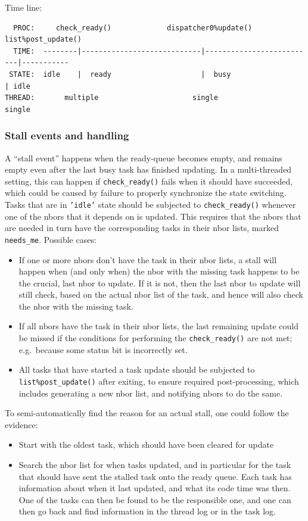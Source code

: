 \documentclass[paper=a4,fontsize=11pt]{scrartcl}
\numberwithin{equation}{section}		%
\numberwithin{figure}{section}			%
\numberwithin{table}{section}				%
\newcommand{\codecolor}{\color{Blue}}
\newcommand{\Code}[1]{{\codecolor\texttt{#1}}}
\def\checkready{\Code{check\_ready()}}
\def\eg{e.g.\ }
\begin{document}
Time line:
{\codecolor\small\begin{verbatim}
  PROC:     check_ready()             dispatcher0%update()        list%post_update()
  TIME:  --------|----------------------------|--------------------------|-----------
 STATE:  idle    |  ready                     |  busy                    | idle
THREAD:       multiple                      single                    single
\end{verbatim}}

\subsubsection{Stall events and handling}
A ``stall event'' happens when the ready-queue becomes empty, and remains empty even after the last busy task has finished updating.  In a multi-threaded setting, this can happen if \checkready{} fails when it should have succeeded, which could be caused by failure to properly synchronize the state switching.  Tasks that are in \Code{'idle'} state should be subjected to \checkready{} whenever one of the nbors that it depends on is updated.   This requires that the nbors that are needed in turn have the corresponding tasks in their nbor lists, marked \Code{needs\_me}.  Possible cases:
\begin{itemize}
    \item If one or more nbors don't have the task in their nbor lists, a stall will happen when (and only when) the nbor with the missing task happens to be the crucial, last nbor to update.  If it is not, then the last nbor to update will still check, based on the actual nbor list of the task, and hence will also check the nbor with the missing task.
    \item If all nbors have the task in their nbor lists, the last remaining update could be missed if the conditions for performing the \checkready{} are not met; \eg because some status bit is incorrectly set.
    \item All tasks that have started a task update should be subjected to \Code{list\%post\_update()} after exiting, to ensure required post-processing, which includes generating a new nbor list, and notifying nbors to do the same.
\end{itemize}
To semi-automatically find the reason for an actual stall, one could follow the evidence:
\begin{itemize}
    \item Start with the oldest task, which should have been cleared for update
    \item Search the nbor list for when tasks updated, and in particular for the task that should have sent the stalled task onto the ready queue.  Each task has information about when it last updated, and what its code time was then.  One of the tasks can then be found to be the responsible one, and one can then go back and find information in the thread log or in the task log.
\end{itemize}
\end{document}
